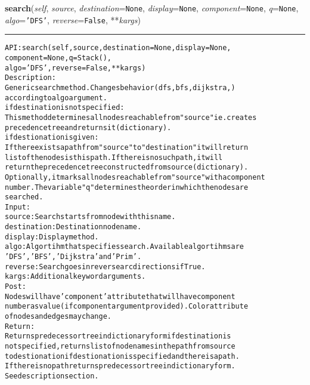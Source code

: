 \hspace{.8\funcindent}\begin{boxedminipage}{\funcwidth}

    \raggedright \textbf{search}(\textit{self}, \textit{source}, \textit{destination}={\tt None}, \textit{display}={\tt None}, \textit{component}={\tt None}, \textit{q}={\tt None}, \textit{algo}={\tt \texttt{'}\texttt{DFS}\texttt{'}}, \textit{reverse}={\tt False}, **\textit{kargs})

    \vspace{-1.5ex}

    \rule{\textwidth}{0.5\fboxrule}
\setlength{\parskip}{2ex}
\begin{alltt}

API: search(self, source, destination = None, display = None,
       component = None, q = Stack(),
       algo = 'DFS', reverse = False, **kargs)
Description:
Generic search method. Changes behavior (dfs,bfs,dijkstra,)
according to algo argument.
if destination is not specified:
   This method determines all nodes reachable from "source" ie. creates
   precedence tree and returns it (dictionary).
if destionation is given:
   If there exists a path from "source" to "destination" it will return
   list of the nodes is this path. If there is no such path, it will
   return the precedence tree constructed from source (dictionary).
Optionally, it marks all nodes reachable from "source" with a component
number. The variable "q" determines the order in which the nodes are
searched.
Input:
    source: Search starts from node with this name.
    destination: Destination node name.
    display: Display method.
    algo: Algortihm that specifies search. Available algortihms are
    'DFS', 'BFS', 'Dijkstra' and 'Prim'.
    reverse: Search goes in reverse arc directions if True.
    kargs: Additional keyword arguments.
Post:
    Nodes will have 'component' attribute that will have component
    number as value (if component argument provided). Color attribute
    of nodes and edges may change.
Return:
    Returns predecessor tree in dictionary form if destination is
    not specified, returns list of node names in the path from source
    to destionation if destionation is specified and there is a path.
    If there is no path returns predecessor tree in dictionary form.
    See description section.
\end{alltt}

\setlength{\parskip}{1ex}
    \end{boxedminipage}

    \label{coinor:gimpy:graph:Graph:set_display_mode}

